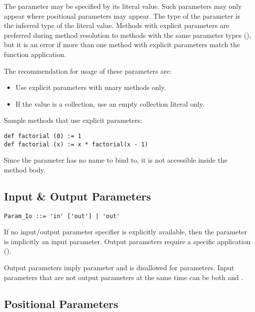 The parameter may be specified by its literal value. Such parameters may only appear where positional parameters may appear. The type of the parameter is the inferred type of the literal value. Methods with explicit parameters are preferred during method resolution to methods with the same parameter types (), but it is an error if more than one method with explicit parameters match the function application. 

The recommendation for usage of these parameters are: 
\begin{itemize}
\item Use explicit parameters with unary methods only. 
\item If the value is a collection, use an empty collection literal only. 
\end{itemize}

\example Sample methods that use explicit parameters:
\begin{lstlisting}
def factorial (0) := 1
def factorial (x) := x * factorial(x - 1)
\end{lstlisting}

Since the parameter has no name to bind to, it is not accessible inside the method body. 






\subsection{Input \& Output Parameters}
\label{sec:io-parameters}

\syntax\begin{lstlisting}
Param_Io ::= 'in' ['out'] | 'out'
\end{lstlisting}

If no input/output parameter specifier is explicitly available, then the parameter is implicitly an input parameter. Output parameters require a specific application ().

Output parameters imply  parameter and is disallowed for  parameters. Input parameters that are not output parameters at the same time can be both  and . 






\subsection{Positional Parameters}
\label{sec:positional-parameters}


